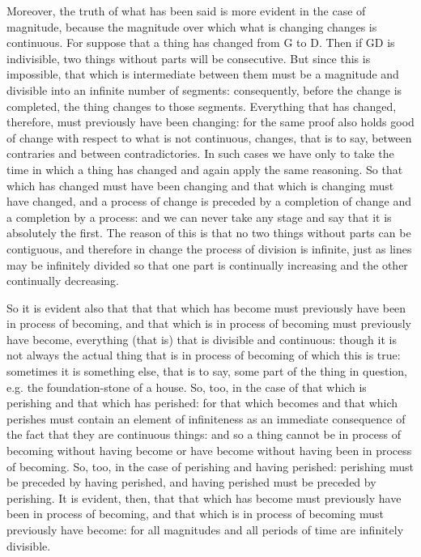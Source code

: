Moreover, the truth of what has been said is more evident in the case
of magnitude, because the magnitude over which what is changing changes
is continuous. For suppose that a thing has changed from G to D. Then
if GD is indivisible, two things without parts will be consecutive.
But since this is impossible, that which is intermediate between them
must be a magnitude and divisible into an infinite number of segments:
consequently, before the change is completed, the thing changes to
those segments. Everything that has changed, therefore, must previously
have been changing: for the same proof also holds good of change with
respect to what is not continuous, changes, that is to say, between
contraries and between contradictories. In such cases we have only
to take the time in which a thing has changed and again apply the
same reasoning. So that which has changed must have been changing
and that which is changing must have changed, and a process of change
is preceded by a completion of change and a completion by a process:
and we can never take any stage and say that it is absolutely the
first. The reason of this is that no two things without parts can
be contiguous, and therefore in change the process of division is
infinite, just as lines may be infinitely divided so that one part
is continually increasing and the other continually decreasing.

So it is evident also that that that which has become must previously
have been in process of becoming, and that which is in process of
becoming must previously have become, everything (that is) that is
divisible and continuous: though it is not always the actual thing
that is in process of becoming of which this is true: sometimes it
is something else, that is to say, some part of the thing in question,
e.g. the foundation-stone of a house. So, too, in the case of that
which is perishing and that which has perished: for that which becomes
and that which perishes must contain an element of infiniteness as
an immediate consequence of the fact that they are continuous things:
and so a thing cannot be in process of becoming without having become
or have become without having been in process of becoming. So, too,
in the case of perishing and having perished: perishing must be preceded
by having perished, and having perished must be preceded by perishing.
It is evident, then, that that which has become must previously have
been in process of becoming, and that which is in process of becoming
must previously have become: for all magnitudes and all periods of
time are infinitely divisible. 

